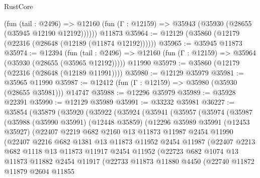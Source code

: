 \begin{lexlean}{RustCore}
\begin{coremodule}
      (fun (tail : @2496) =>
      @12160 (fun (Γ : @12159) => @35943 (@35930 (@28655 (@35945 @12190 @12192))))))
    @11873
@35964 := @12129 (@35860 (@12179 (@22316 (@28648 (@12189 (@11874 @12192))))))
@35965 := @35945 @11873
@35974 := @12394
    (fun (tail : @2496) => @12160 (fun (Γ : @12159) => @35964 (@35930 (@28655 (@35965 @12192)))))
    @11990
@35979 := @35860 (@12179 (@22316 (@28648 (@12189 @11991))))
@35980 := @12129 @35979
@35981 := @35965 @11990
@35987 := @12412 (fun (Γ : @12159) => @35980 (@35930 (@28655 @35981))) @14747
@35988 := @12296 @35979
@35989 := @35928 @22391
@35990 := @12129 @35989
@35991 := @33232 @35981
@36227 := @35854
    (@35879
      (@35920
        (@35922
          (@35924
            (@35941
              (@35957
                (@35974
                  (@35987
                    (@35988
                      (@35990 @35991)
                      (@12448 @35859)
                      (@12296
                        @35989
                        @35991
                        (@12453 @35927)
                        (@22407
                          @2219
                          @682
                          @2160
                          @13
                          @11873
                          @11987
                          @2454
                          @11990
                          (@22407
                            @2216
                            @682
                            @1381
                            @13
                            @11873
                            @11952
                            @2454
                            @11987
                            (@22407
                              @2213
                              @682
                              @1118
                              @13
                              @11873
                              @11917
                              @2454
                              @11952
                              (@22723
                                @682
                                @1074
                                @13
                                @11873
                                @11882
                                @2454
                                @11917
                                (@22733
                                  @11873
                                  @11880
                                  @4450
                                  (@22740
                                    @11872
                                    @11879
                                    @2604
                                    @11855

\end{coremodule}
\end{lexlean}

